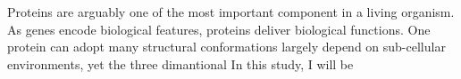 Proteins are arguably one of the most important component in a living organism. As genes encode biological features, proteins deliver biological functions. One protein can adopt many structural conformations largely depend on sub-cellular environments, yet the three dimantional     In this study, I will be 